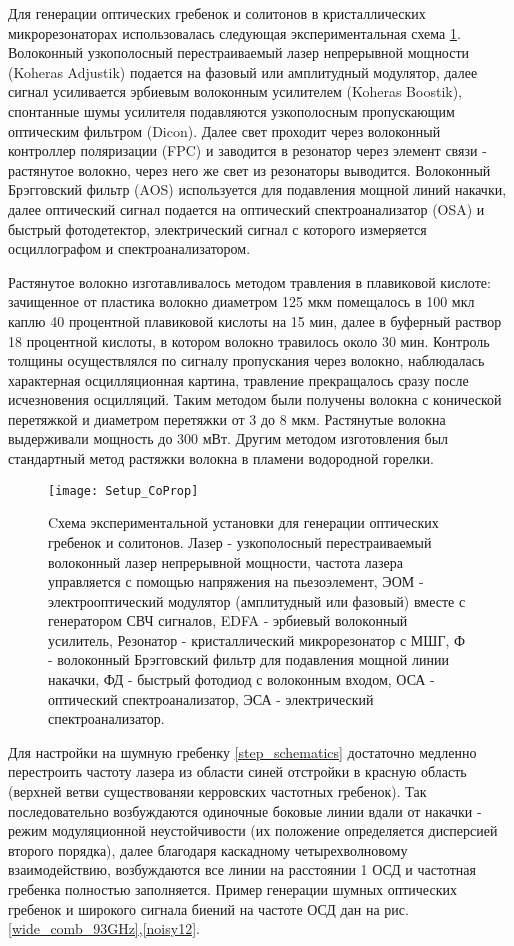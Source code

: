 Для генерации оптических гребенок и солитонов в кристаллических микрорезонаторах использовалась следующая экспериментальная схема \ref{Setup_CoProp}. Волоконный узкополосный перестраиваемый лазер непрерывной мощности (Koheras Adjustik) подается на фазовый или амплитудный модулятор, далее сигнал усиливается эрбиевым волоконным усилителем (Koheras Boostik), спонтанные шумы усилителя подавляются узкополосным пропускающим оптическим фильтром (Dicon). Далее свет проходит через волоконный контроллер поляризации (FPC) и заводится в резонатор через элемент связи - растянутое волокно, через него же свет из резонаторы выводится. Волоконный Брэгговский фильтр (AOS) используется для подавления мощной линий накачки, далее оптический сигнал подается на оптический спектроанализатор (OSA) и быстрый фотодетектор, электрический сигнал с которого измеряется осциллографом и спектроанализатором.

Растянутое волокно изготавливалось методом травления в плавиковой кислоте: зачищенное от пластика волокно диаметром 125 мкм помещалось в 100 мкл каплю 40 процентной плавиковой кислоты на 15 мин, далее в буферный раствор 18 процентной кислоты, в котором волокно травилось около 30 мин. Контроль толщины осуществлялся по сигналу пропускания через волокно, наблюдалась характерная осцилляционная картина, травление прекращалось сразу после исчезновения осцилляций. Таким методом были получены волокна с конической перетяжкой и диаметром перетяжки от 3 до 8 мкм. Растянутые волокна выдерживали мощность до 300 мВт. Другим методом изготовления был стандартный метод растяжки волокна в пламени водородной горелки.

\begin{figure}[ht]
\centering
  \texttt{[image: Setup\_CoProp]}
  \caption{Cхема экспериментальной установки для генерации оптических гребенок и солитонов. Лазер - узкополосный перестраиваемый волоконный лазер непрерывной мощности, частота лазера управляется с помощью напряжения на пьезоэлемент, ЭОМ - электрооптический модулятор (амплитудный или фазовый) вместе с генератором СВЧ сигналов, EDFA - эрбиевый волоконный усилитель, Резонатор - кристаллический микрорезонатор с МШГ, Ф - волоконный Брэгговский фильтр для подавления мощной линии накачки, ФД - быстрый фотодиод с волоконным входом, ОСА - оптический спектроанализатор, ЭСА - электрический спектроанализатор.}
  \label{Setup_CoProp}
\end{figure}

Для настройки на шумную гребенку \ref{step_schematics} достаточно медленно перестроить частоту лазера из области синей отстройки в красную область (верхней ветви существованяи керровских частотных гребенок). Так последовательно возбуждаются одиночные боковые линии вдали от накачки - режим модуляционной неустойчивости (их положение определяется дисперсией второго порядка), далее благодаря каскадному четырехволновому взаимодействию, возбуждаются все линии на расстоянии 1 ОСД и частотная гребенка полностью заполняется. Пример генерации шумных оптических гребенок и широкого сигнала биений на частоте ОСД дан на рис. \ref{wide_comb_93GHz},\ref{noisy12}.

